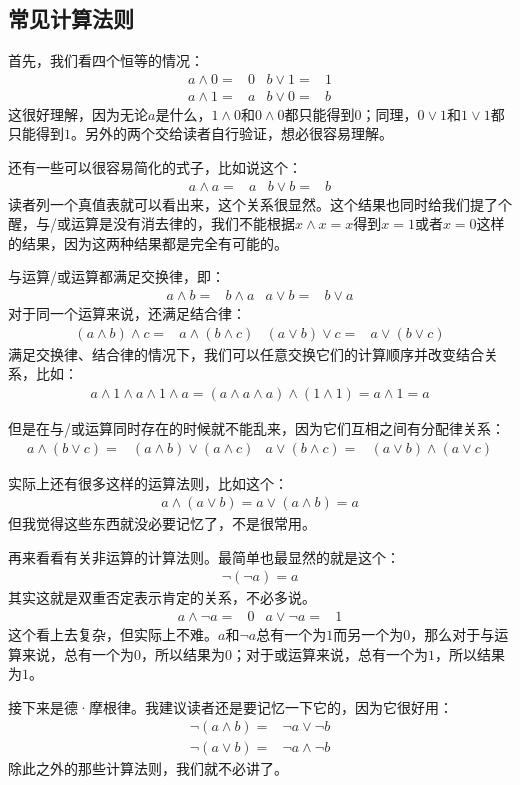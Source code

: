 \subsection*{常见计算法则}
首先，我们看四个恒等的情况：
\begin{align*}
a\land0={}&0{}&b\lor1={}&1\\
a\land1={}&a{}&b\lor0={}&b
\end{align*}
这很好理解，因为无论$a$是什么，$1\land0$和$0\land0$都只能得到$0$；同理，$0\lor1$和$1\lor1$都只能得到$1$。另外的两个交给读者自行验证，想必很容易理解。\par
还有一些可以很容易简化的式子，比如说这个：
\begin{align*}
a\land a={}&a{}&b\lor b={}&b
\end{align*}
读者列一个真值表就可以看出来，这个关系很显然。这个结果也同时给我们提了个醒，与/或运算是没有消去律的，我们不能根据$x\land x=x$得到$x=1$或者$x=0$这样的结果，因为这两种结果都是完全有可能的。\par
与运算/或运算都满足交换律，即：
\begin{align*}
a\land b={}&b\land a{}&a\lor b={}&b\lor a
\end{align*}
对于同一个运算来说，还满足结合律：
\begin{align*}
(a\land b)\land c={}&a\land(b\land c){}&(a\lor b)\lor c={}&a\lor(b\lor c)
\end{align*}
满足交换律、结合律的情况下，我们可以任意交换它们的计算顺序并改变结合关系，比如：
\begin{align*}
a\land1\land a\land1\land a=(a\land a\land a)\land(1\land 1)=a\land1=a
\end{align*}\par
但是在与/或运算同时存在的时候就不能乱来，因为它们互相之间有分配律关系：
\begin{align*}
a\land(b\lor c)={}&(a\land b)\lor(a\land c){}&a\lor(b\land c)={}&(a\lor b)\land(a\lor c)
\end{align*}\par
实际上还有很多这样的运算法则，比如这个：
\begin{align*}
a\land(a\lor b)=a\lor(a\land b)=a
\end{align*}
但我觉得这些东西就没必要记忆了，不是很常用。\par
再来看看有关非运算的计算法则。最简单也最显然的就是这个：
\begin{align*}
\lnot(\lnot a)=a
\end{align*}
其实这就是双重否定表示肯定的关系，不必多说。
\begin{align*}
a\land\lnot a={}&0{}&a\lor\lnot a={}&1
\end{align*}
这个看上去复杂，但实际上不难。$a$和$\lnot a$总有一个为$1$而另一个为$0$，那么对于与运算来说，总有一个为$0$，所以结果为$0$；对于或运算来说，总有一个为$1$，所以结果为$1$。\par
接下来是德·摩根律。我建议读者还是要记忆一下它的，因为它很好用：
\begin{align*}
\lnot(a\land b)={}&\lnot a\lor\lnot b\\
\lnot(a\lor b)={}&\lnot a\land\lnot b
\end{align*}
除此之外的那些计算法则，我们就不必讲了。\par
